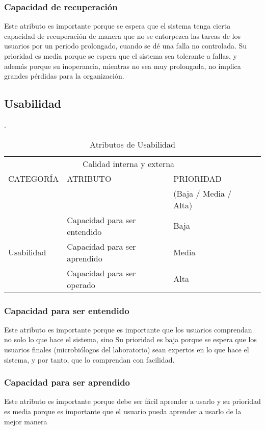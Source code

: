 \documentclass[12pt]{article}
\begin{document}
\subsubsection{Capacidad de recuperación}
\vspace*{0.2in}
Este atributo es importante porque se espera que el sistema tenga cierta capacidad de recuperación de manera que no se entorpezca las tareas de los usuarios por un periodo prolongado, cuando se dé una falla no controlada. Su prioridad es media porque se espera que el sistema sea tolerante a fallas, y además porque su inoperancia, mientras no sea muy prolongada, no implica grandes pérdidas para la organización.\\[5 cm]



\subsection{Usabilidad}.

\begin{table}[htb]
\centering
\begin{tabular}{|l|l|l|l|}
\hline
\multicolumn{3}{|c|}{Calidad interna y externa   } \\
\cline{1-3}
CATEGORÍA & ATRIBUTO & PRIORIDAD\\ & & (Baja / Media / Alta)\\
\hline \hline
\multirow{3}{3cm}{Usabilidad} & Capacidad para ser entendido & Baja \\ \cline{2-3}
& Capacidad para ser aprendido &  Media\\ \cline{2-3}
& Capacidad para ser operado & Alta\\ \cline{1-3}
\end{tabular}
\caption{Atributos de Usabilidad}
\label{tabla:final}
\end{table}%
\subsubsection{Capacidad para ser entendido}
\vspace*{0.2in}
Este atributo es importante porque es importante que los usuarios comprendan no solo lo que hace el sistema, sino  Su prioridad es baja porque se espera que los usuarios finales (microbiólogos del laboratorio) sean expertos en lo que hace el sistema, y por tanto, que lo comprendan con facilidad.
\subsubsection{Capacidad para ser aprendido}
\vspace*{0.2in}
Este atributo es importante porque debe ser fácil aprender a usarlo y su prioridad es media porque es importante que el usuario pueda aprender a usarlo de la mejor manera 
\end{document}
